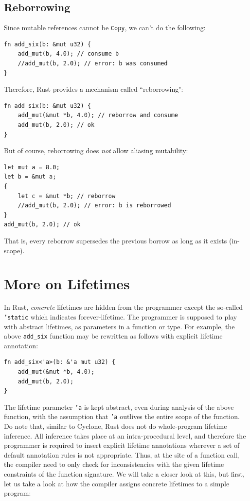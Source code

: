 \documentclass[11pt]{report}
\begin{document}
\subsection*{Reborrowing}

Since mutable references cannot be \texttt{Copy}, we can't do the following:

\begin{lstlisting}
fn add_six(b: &mut u32) {
    add_mut(b, 4.0); // consume b
    //add_mut(b, 2.0); // error: b was consumed
}
\end{lstlisting}

\noindent Therefore, Rust provides a mechanism called ``reborrowing":

\begin{lstlisting}
fn add_six(b: &mut u32) {
    add_mut(&mut *b, 4.0); // reborrow and consume
    add_mut(b, 2.0); // ok
}
\end{lstlisting}

\noindent But of course, reborrowing does \textit{not} allow aliasing mutability:

\begin{lstlisting}
let mut a = 8.0;
let b = &mut a;
{
    let c = &mut *b; // reborrow
    //add_mut(b, 2.0); // error: b is reborrowed
}
add_mut(b, 2.0); // ok
\end{lstlisting}

\noindent That is, every reborrow supersedes the previous borrow as long as it exists (in-scope).

\section*{More on Lifetimes}

In Rust, \textit{concrete} lifetimes are hidden from the programmer except the so-called \texttt{'static} which indicates forever-lifetime. The programmer is supposed to play with abstract lifetimes, as parameters in a function or type. For example, the above \texttt{add\_six} function may be rewritten as follows with explicit lifetime annotation:

\begin{lstlisting}
fn add_six<'a>(b: &'a mut u32) {
    add_mut(&mut *b, 4.0);
    add_mut(b, 2.0);
}
\end{lstlisting}

The lifetime parameter \texttt{'a} is kept abstract, even during analysis of the above function, with the assumption that \texttt{'a} outlives the entire scope of the function. Do note that, similar to Cyclone, Rust does not do whole-program lifetime inference. All inference takes place at an intra-procedural level, and therefore the programmer is required to insert explicit lifetime annotations wherever a set of default annotation rules is not appropriate. Thus, at the site of a function call, the compiler need to only check for inconsistencies with the given lifetime constraints of the function signature. We will take a closer look at this, but first, let us take a look at how the compiler assigns concrete lifetimes to a simple program:
\end{document}
